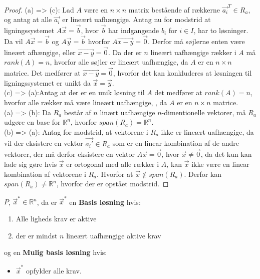 \begin{proof}
(a) => (c): Lad $A$ være en $n \times n$ matrix bestående af rækkerne $\vec{a_i}^T \in R_a$, og antag at alle $\vec{a_i}$ er lineært uafhængige. 
Antag nu for modstrid at ligningssystemet $A\vec{x} = \vec{b}$, hvor $\vec{b}$ har indgangende $b_i$ for $i \in I$, har to løsninger. 
Da vil $A \vec{x} = \vec{b}$ og $A \vec{y} = \vec{b}$ hvorfor $A\vec{x-y} = \vec{0}$.
Derfor må søjlerne enten være lineært afhængige, eller $\vec{x-y} = \vec{0}$.
Da der er $n$ lineært uafhængige rækker i $A$ må $rank(A) = n$, hvorfor alle søjler er lineært uafhængige, da $A$ er en $n \times n$ matrice.
Det medfører at $\vec{x-y} = \vec{0}$, hvorfor det kan konkluderes at løsningen til ligningssystemet er unikt da $ \vec{x}=\vec{y}$.
\\(c) => (a):Antag at der er en unik løsning til $A$ det medfører at $rank(A) = n$, hvorfor alle rækker må være lineært uafhængige, , da $A$ er en $n \times n$ matrice. %
\\ (a) => (b): Da $R_a$ består af $n$ linært uafhængige $n$-dimentionelle vektorer, må $R_a$ udgøre en base for $\mathds{R}^n$, hvorfor $span(R_a) = \mathds{R}^n$.
\\ (b) => (a): Antag for modstrid, at vektorene i $R_a$ ikke er lineært uafhængige, da vil der eksistere en vektor $\vec{a_i'} \in R_a$ som er en linear kombination af de andre vektorer, der må derfor eksistere en vektor $A\vec{x} = \vec{0}$, hvor $\vec{x} \neq \vec{0}$, da det kun kan lade sig gøre hvis $\vec{x}$ er ortogonal med alle rækker i $A$, kan $\vec{x}$ ikke være en linear kombination af vektorene i $R_a$.
Hvorfor at $\vec{x} \notin span(R_a)$.
Derfor kan $span(R_a) \neq \mathds{R}^n$, hvorfor der er opstået modstrid.
\end{proof}





\begin{defn}
$P$, $\vec{x}^*\in \mathds{R}^n$, da er $\vec{x}^*$ en \textbf{Basis løsning} hvis:
\begin{enumerate}[label=(\alph*)]
\item Alle ligheds krav er aktive
\item der er mindst $n$ lineært uafhængige aktive krav
\end{enumerate}
og en \textbf{Mulig basis løsning} hvis:
\begin{itemize}
\item $\vec{x}^*$ opfylder alle krav.
\end{itemize}
\end{defn}


